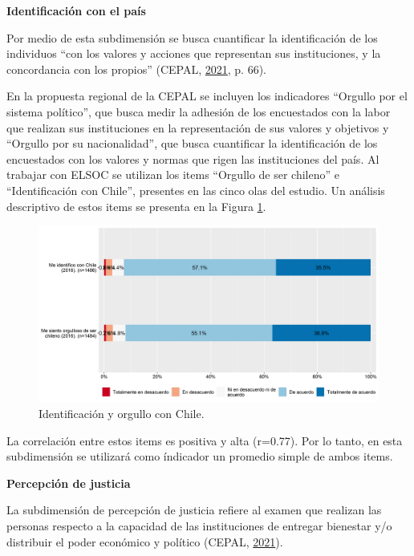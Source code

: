 \documentclass[
  12pt,
]{book}
\begin{document}
\textbf{Identificación con el país}

Por medio de esta subdimensión se busca cuantificar la identificación de los individuos ``con los valores y acciones que representan sus instituciones, y la concordancia con los propios'' (CEPAL, \protect\hyperlink{ref-cepal_cohesion_2021}{2021}, p. 66).

En la propuesta regional de la CEPAL se incluyen los indicadores ``Orgullo por el sistema político'', que busca medir la adhesión de los encuestados con la labor que realizan sus instituciones en la representación de sus valores y objetivos y ``Orgullo por su nacionalidad'', que busca cuantificar la identificación de los encuestados con los valores y normas que rigen las instituciones del país. Al trabajar con ELSOC se utilizan los items ``Orgullo de ser chileno'' e ``Identificación con Chile'', presentes en las cinco olas del estudio. Un análisis descriptivo de estos items se presenta en la Figura \ref{fig:identificacion}.

\begin{figure}[H]

{\centering \includegraphics[width=1\linewidth,height=1\textheight]{output/graphs/identificacion} 

}

\caption{Identificación y orgullo con Chile.}\label{fig:identificacion}
\end{figure}

La correlación entre estos items es positiva y alta (r=0.77). Por lo tanto, en esta subdimensión se utilizará como índicador un promedio simple de ambos items.

\textbf{Percepción de justicia}

La subdimensión de percepción de justicia refiere al examen que realizan las personas respecto a la capacidad de las instituciones de entregar bienestar y/o distribuir el poder económico y político (CEPAL, \protect\hyperlink{ref-cepal_cohesion_2021}{2021}).
\end{document}
